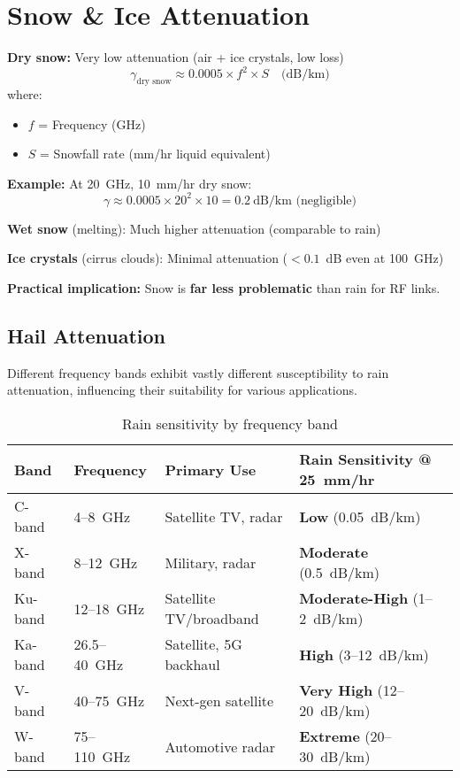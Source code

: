 \section{Snow \& Ice Attenuation}

\textbf{Dry snow:} Very low attenuation (air + ice crystals, low loss)
\begin{equation}
\gamma_{\text{dry snow}} \approx 0.0005 \times f^2 \times S \quad \text{(dB/km)}
\end{equation}
where:
\begin{itemize}
\item $f$ = Frequency (GHz)
\item $S$ = Snowfall rate (mm/hr liquid equivalent)
\end{itemize}

\textbf{Example:} At 20~GHz, 10~mm/hr dry snow:
\begin{equation}
\gamma \approx 0.0005 \times 20^2 \times 10 = 0.2~\text{dB/km (negligible)}
\end{equation}

\textbf{Wet snow} (melting): Much higher attenuation (comparable to rain)

\textbf{Ice crystals} (cirrus clouds): Minimal attenuation ($< 0.1$~dB even at 100~GHz)

\textbf{Practical implication:} Snow is \textbf{far less problematic} than rain for RF links.

\subsection{Hail Attenuation}

Different frequency bands exhibit vastly different susceptibility to rain attenuation, influencing their suitability for various applications.

\begin{table}[h!]
\centering
\caption{Rain sensitivity by frequency band}
\label{tab:band-sensitivity}
\begin{tabular}{@{}llll@{}}
\toprule
Band & Frequency & Primary Use & Rain Sensitivity @ 25~mm/hr \\
\midrule
C-band & 4--8~GHz & Satellite TV, radar & \textbf{Low} (0.05~dB/km) \\
X-band & 8--12~GHz & Military, radar & \textbf{Moderate} (0.5~dB/km) \\
Ku-band & 12--18~GHz & Satellite TV/broadband & \textbf{Moderate-High} (1--2~dB/km) \\
Ka-band & 26.5--40~GHz & Satellite, 5G backhaul & \textbf{High} (3--12~dB/km) \\
V-band & 40--75~GHz & Next-gen satellite & \textbf{Very High} (12--20~dB/km) \\
W-band & 75--110~GHz & Automotive radar & \textbf{Extreme} (20--30~dB/km) \\
\bottomrule
\end{tabular}
\end{table}

